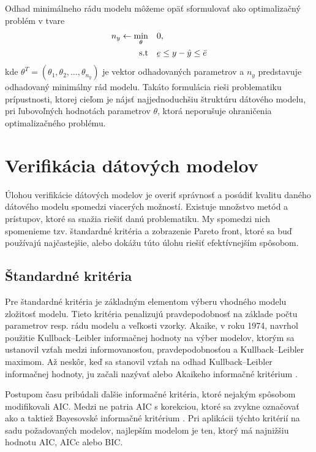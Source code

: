Odhad minimálneho rádu modelu môžeme opäť sformulovať ako optimalizačný problém v tvare
\begin{equation}
	\begin{split}
		n_y \leftarrow \min_{\theta} & \quad 0, \\
		\text{s.t} & \quad \ubar{e} \leq y - \hat{y} \leq \bar{e}
	\end{split}
	\label{eq:GPE_m_order_est}
\end{equation}
kde $ \theta^T = (\theta_1, \theta_2, \dots, \theta_{n_y}) $ je vektor odhadovaných parametrov a $ n_y $ predstavuje odhadovaný minimálny rád modelu. Takáto formulácia rieši problematiku prípustnosti, ktorej cieľom je nájsť najjednoduchšiu štruktúru dátového modelu, pri ľubovoľných hodnotách parametrov $ \theta $, ktorá neporušuje ohraničenia optimalizačného problému.  

\section{Verifikácia dátových modelov}
Úlohou verifikácie dátových modelov je overiť správnosť a posúdiť kvalitu daného dátového modelu spomedzi viacerých možností. Existuje množstvo metód a prístupov, ktoré sa snažia riešiť danú problematiku. My spomedzi nich spomenieme tzv. štandardné kritéria a zobrazenie Pareto front, ktoré sa buď používajú najčastejšie, alebo dokážu túto úlohu riešiť efektívnejším spôsobom.

\subsection{Štandardné kritéria}
Pre štandardné kritéria je základným elementom výberu vhodného modelu zložitosť modelu. Tieto kritéria penalizujú pravdepodobnosť na základe počtu parametrov resp. rádu modelu a veľkosti vzorky. Akaike, v roku 1974, navrhol použitie Kullback–Leibler informačnej hodnoty na výber modelov, ktorým sa ustanovil vzťah medzi informovanosťou, pravdepodobnosťou a Kullback–Leibler maximom. Až neskôr, keď sa stanovil vzťah na odhad  Kullback–Leibler informačnej hodnoty, ju začali nazývať  alebo Akaikeho informačné kritérium  \cite{emiliano:stand_crit:2014}. 

Postupom času pribúdali ďalšie informačné kritéria, ktoré nejakým spôsobom modifikovali AIC. Medzi ne patria AIC s korekciou, ktoré sa zvykne označovať ako  a taktiež Bayesovské informačné kritérium . Pri aplikácii týchto kritérií na sadu požadovaných modelov, najlepším modelom je ten, ktorý má najnižšiu hodnotu AIC, AICc alebo BIC.


